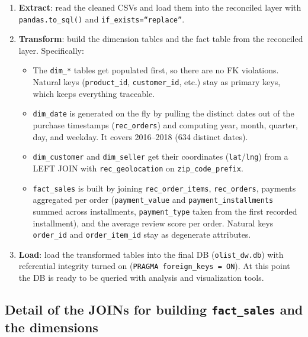 \documentclass[12pt,a4paper]{article}
\begin{document}
\begin{enumerate}
  \item \textbf{Extract}: read the cleaned CSVs and load them into the reconciled
        layer with \texttt{pandas.to\_sql()} and \texttt{if\_exists=``replace''}.

  \item \textbf{Transform}: build the dimension tables and the fact table from the
        reconciled layer. Specifically:
        \begin{itemize}
          \item The \texttt{dim\_*} tables get populated first, so there are no FK
                violations. Natural keys (\texttt{product\_id},
                \texttt{customer\_id}, etc.) stay as primary keys, which keeps
                everything traceable.
          \item \texttt{dim\_date} is generated on the fly by pulling the distinct
                dates out of the purchase timestamps (\texttt{rec\_orders}) and
                computing year, month, quarter, day, and weekday. It covers
                2016--2018 (634 distinct dates).
          \item \texttt{dim\_customer} and \texttt{dim\_seller} get their
                coordinates (\texttt{lat}/\texttt{lng}) from a LEFT JOIN with
                \texttt{rec\_geolocation} on \texttt{zip\_code\_prefix}.
          \item \texttt{fact\_sales} is built by joining
                \texttt{rec\_order\_items}, \texttt{rec\_orders}, payments
                aggregated per order (\texttt{payment\_value} and
                \texttt{payment\_installments} summed across installments,
                \texttt{payment\_type} taken from the first recorded installment),
                and the average review score per order. Natural keys
                \texttt{order\_id} and \texttt{order\_item\_id} stay as degenerate
                attributes.
        \end{itemize}

  \item \textbf{Load}: load the transformed tables into the final DB
        (\texttt{olist\_dw.db}) with referential integrity turned on
        (\texttt{PRAGMA foreign\_keys = ON}). At this point the DB is ready to be
        queried with analysis and visualization tools.
\end{enumerate}

\subsection{Detail of the JOINs for building \texttt{fact\_sales} and the dimensions}
\label{sec:join-fact-sales}
\end{document}
